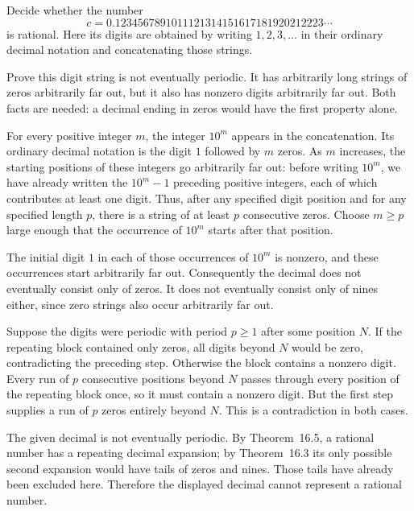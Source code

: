 \goal Decide whether the number
\[
 c=0.1234567891011121314151617181920212223\cdots
\]
is rational. Here its digits are obtained by writing $1,2,3,\ldots$
in their ordinary decimal notation and concatenating those strings.

\idea Prove this digit string is not eventually periodic. It has
arbitrarily long strings of zeros arbitrarily far out, but it also
has nonzero digits arbitrarily far out. Both facts are needed:
a decimal ending in zeros would have the first property alone.

For every positive integer $m$, the integer $10^m$ appears in the
concatenation. Its ordinary decimal notation is the digit $1$
followed by $m$ zeros. As $m$ increases, the starting positions
of these integers go arbitrarily far out: before writing $10^m$,
we have already written the $10^m-1$ preceding positive integers,
each of which contributes at least one digit.
Thus, after any specified digit position and for any specified
length $p$, there is a string of at least $p$ consecutive zeros.
Choose $m\ge p$ large enough that the occurrence of $10^m$
starts after that position.

The initial digit $1$ in each of those occurrences of $10^m$ is
nonzero, and these occurrences start arbitrarily far out.
Consequently the decimal does not eventually consist only of zeros.
It does not eventually consist only of nines either, since zero
strings also occur arbitrarily far out.

Suppose the digits were periodic with period $p\ge1$ after some
position $N$. If the repeating block contained only zeros, all
digits beyond $N$ would be zero, contradicting the preceding step.
Otherwise the block contains a nonzero digit. Every run of $p$
consecutive positions beyond $N$ passes through every position of
the repeating block once, so it must contain a nonzero digit.
But the first step supplies a run of $p$ zeros entirely beyond
$N$. This is a contradiction in both cases.

The given decimal is not eventually periodic. By Theorem~16.5,
a rational number has a repeating decimal expansion; by
Theorem~16.3 its only possible second expansion would have tails
of zeros and nines. Those tails have already been excluded here.
Therefore the displayed decimal cannot represent a rational number.


